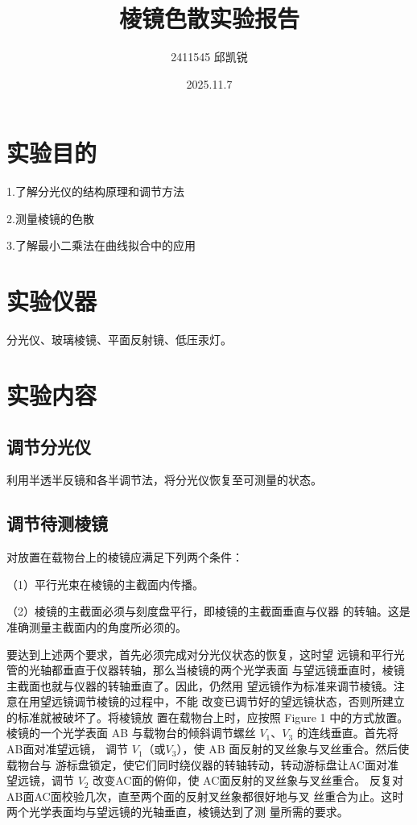 \documentclass[12pt]{article}
\title{棱镜色散实验报告}
\author{2411545 邱凯锐}
\date{2025.11.7}
\begin{document}
\maketitle

\section{实验目的}
1.了解分光仪的结构原理和调节方法

2.测量棱镜的色散

3.了解最小二乘法在曲线拟合中的应用

\section{实验仪器}
分光仪、玻璃棱镜、平面反射镜、低压汞灯。

\section{实验内容}

\subsection{调节分光仪}
利用半透半反镜和各半调节法，将分光仪恢复至可测量的状态。

\subsection{调节待测棱镜}
对放置在载物台上的棱镜应满足下列两个条件： 

（1）平行光束在棱镜的主截面内传播。 

（2）棱镜的主截面必须与刻度盘平行，即棱镜的主截面垂直与仪器
的转轴。这是准确测量主截面内的角度所必须的。 

要达到上述两个要求，首先必须完成对分光仪状态的恢复，这时望
远镜和平行光管的光轴都垂直于仪器转轴，那么当棱镜的两个光学表面
与望远镜垂直时，棱镜主截面也就与仪器的转轴垂直了。因此，仍然用
望远镜作为标准来调节棱镜。注意在用望远镜调节棱镜的过程中，不能
改变已调节好的望远镜状态，否则所建立的标准就被破坏了。将棱镜放
置在载物台上时，应按照 Figure 1 中的方式放置。棱镜的一个光学表面 AB
与载物台的倾斜调节螺丝 $V_1$、$V_3$ 的连线垂直。首先将AB面对准望远镜，
调节 $V_1$（或$V_3$），使 AB 面反射的叉丝象与叉丝重合。然后使载物台与
游标盘锁定，使它们同时绕仪器的转轴转动，转动游标盘让AC面对准
望远镜，调节 $V_2$ 改变AC面的俯仰，使 AC面反射的叉丝象与叉丝重合。
反复对AB面AC面校验几次，直至两个面的反射叉丝象都很好地与叉
丝重合为止。这时两个光学表面均与望远镜的光轴垂直，棱镜达到了测
量所需的要求。
\end{document}
